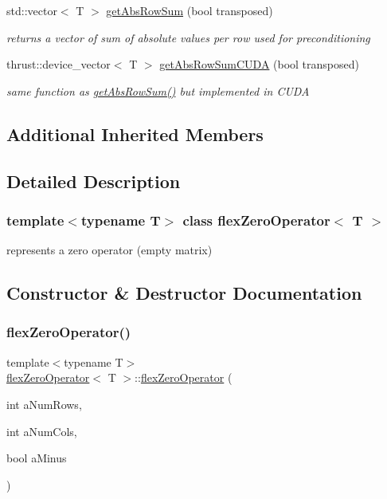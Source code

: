 \begin{DoxyCompactItemize}
std\+::vector$<$ T $>$ \hyperlink{classflex_zero_operator_a4c9fbbcd1961590e2fabef75197f4367}{get\+Abs\+Row\+Sum} (bool transposed)
\begin{DoxyCompactList}\small\item\em returns a vector of sum of absolute values per row used for preconditioning \end{DoxyCompactList}\item 
thrust\+::device\+\_\+vector$<$ T $>$ \hyperlink{classflex_zero_operator_ad63f43f4b1abe71779e5b0ee364b93d1}{get\+Abs\+Row\+Sum\+C\+U\+DA} (bool transposed)
\begin{DoxyCompactList}\small\item\em same function as \hyperlink{classflex_zero_operator_a4c9fbbcd1961590e2fabef75197f4367}{get\+Abs\+Row\+Sum()} but implemented in C\+U\+DA \end{DoxyCompactList}\end{DoxyCompactItemize}
\subsection*{Additional Inherited Members}


\subsection{Detailed Description}
\subsubsection*{template$<$typename T$>$\newline
class flex\+Zero\+Operator$<$ T $>$}

represents a zero operator (empty matrix) 

\subsection{Constructor \& Destructor Documentation}
\mbox{\label{classflex_zero_operator_a0d8f5246a460441e8ff71d6fe7359e23}} 
\subsubsection{\texorpdfstring{flex\+Zero\+Operator()}{flexZeroOperator()}}
{\footnotesize\ttfamily template$<$typename T$>$ \\
\hyperlink{classflex_zero_operator}{flex\+Zero\+Operator}$<$ T $>$\+::\hyperlink{classflex_zero_operator}{flex\+Zero\+Operator} (\begin{DoxyParamCaption}\item[{int}]{a\+Num\+Rows,  }\item[{int}]{a\+Num\+Cols,  }\item[{bool}]{a\+Minus }\end{DoxyParamCaption})\hspace{0.3cm}{\ttfamily [inline]}}



